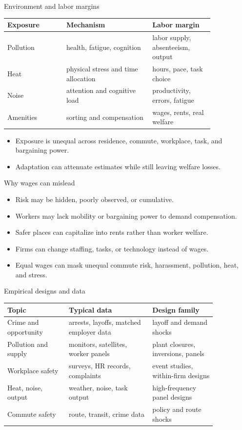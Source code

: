 \documentclass[aspectratio=169,11pt]{beamer}
\begin{document}
\begin{frame}{Environment and labor margins}
\small
\begin{tabular}{p{0.24\linewidth} p{0.35\linewidth} p{0.25\linewidth}}
\toprule
Exposure & Mechanism & Labor margin \\
\midrule
Pollution & health, fatigue, cognition & labor supply, absenteeism, output \\
Heat & physical stress and time allocation & hours, pace, task choice \\
Noise & attention and cognitive load & productivity, errors, fatigue \\
Amenities & sorting and compensation & wages, rents, real welfare \\
\bottomrule
\end{tabular}
\vspace{0.5em}
\begin{itemize}
    \item Exposure is unequal across residence, commute, workplace, task, and bargaining power.
    \item Adaptation can attenuate estimates while still leaving welfare losses.
\end{itemize}
\end{frame}

\begin{frame}{Why wages can mislead}
\begin{itemize}
    \item Risk may be hidden, poorly observed, or cumulative.
    \item Workers may lack mobility or bargaining power to demand compensation.
    \item Safer places can capitalize into rents rather than worker welfare.
    \item Firms can change staffing, tasks, or technology instead of wages.
    \item Equal wages can mask unequal commute risk, harassment, pollution, heat, and stress.
\end{itemize}
\end{frame}

\begin{frame}{Empirical designs and data}
\small
\begin{tabular}{p{0.25\linewidth} p{0.34\linewidth} p{0.26\linewidth}}
\toprule
Topic & Typical data & Design family \\
\midrule
Crime and opportunity & arrests, layoffs, matched employer data & layoff and demand shocks \\
Pollution and supply & monitors, satellites, worker panels & plant closures, inversions, panels \\
Workplace safety & surveys, HR records, complaints & event studies, within-firm designs \\
Heat, noise, output & weather, noise, task output & high-frequency panel designs \\
Commute safety & route, transit, crime data & policy and route shocks \\
\bottomrule
\end{tabular}
\end{frame}
\end{document}
